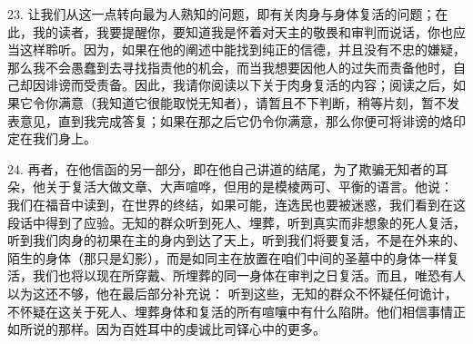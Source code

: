 23. 让我们从这一点转向最为人熟知的问题，即有关肉身与身体复活的问题；在此，我的读者，我要提醒你，要知道我是怀着对天主的敬畏和审判而说话，你也应当这样聆听。因为，如果在他的阐述中能找到纯正的信德，并且没有不忠的嫌疑，那么我不会愚蠢到去寻找指责他的机会，而当我想要因他人的过失而责备他时，自己却因诽谤而受责备。因此，我请你阅读以下关于肉身复活的内容；阅读之后，如果它令你满意（我知道它很能取悦无知者），请暂且不下判断，稍等片刻，暂不发表意见，直到我完成答复；如果在那之后它仍令你满意，那么你便可将诽谤的烙印定在我们身上。\par

24. 再者，在他信函的另一部分，即在他自己讲道的结尾，为了欺骗无知者的耳朵，他关于复活大做文章、大声喧哗，但用的是模棱两可、平衡的语言。他说： 我们在福音中读到，在世界的终结，如果可能，连选民也要被迷惑，我们看到在这段话中得到了应验。无知的群众听到死人、埋葬，听到真实而非想象的死人复活，听到我们肉身的初果在主的身内到达了天上，听到我们将要复活，不是在外来的、陌生的身体（那只是幻影），而是如同主在放置在咱们中间的圣墓中的身体一样复活，我们也将以现在所穿戴、所埋葬的同一身体在审判之日复活。而且，唯恐有人以为这还不够，他在最后部分补充说： 听到这些，无知的群众不怀疑任何诡计，不怀疑在这关于死人、埋葬身体和复活的所有喧嚷中有什么陷阱。他们相信事情正如所说的那样。因为百姓耳中的虔诚比司铎心中的更多。\par

